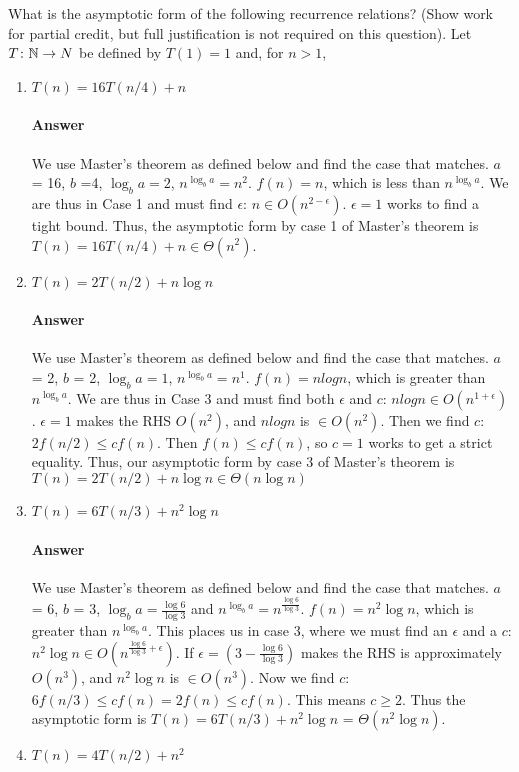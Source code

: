 \documentclass{article}
\begin{document}
\collab{\todo{}}

What is the asymptotic form of the following recurrence
relations? (Show work for partial credit, but full justification is not required
on this question).
Let $T \colon {\mathbb N} \to N$ be defined by $T(1)=1$ and, for $n>1$,
\begin{enumerate}
    \item $T(n) = 16 T(n/4) + n$
        \paragraph{Answer}{We use Master's theorem as defined below and find the case that matches. $a$ = 16, $b$ =4, ${\log_b a} = 2$, $n^{\log_b a} = n^2$. $f(n) = n$, which is less than $n^{\log_b a}$. We are thus in Case 1 and must find $\epsilon$: $n \in O(n^{2-\epsilon})$. $\epsilon = 1$ works to find a tight bound. Thus, the asymptotic form by case 1 of Master's theorem is $T(n) = 16 T(n/4) + n \in \Theta(n^2)$.}
    \item $T(n) = 2 T(n/2) + n \log{n}$
        \paragraph{Answer}{We use Master's theorem as defined below and find the case that matches. $a$ = 2, $b$ = 2, ${\log_b a} = 1$, $n^{\log_b a} = n^1$. $f(n) = nlogn$, which is greater than $n^{\log_b a}$. We are thus in Case 3 and must find both $\epsilon$ and $c$: $nlogn \in O(n^{1+\epsilon})$. $\epsilon = 1$ makes the RHS $O(n^2)$, and $nlogn$ is $\in O(n^2)$. Then we find $c$: $2f(n/2) \leq cf(n)$. Then $f(n) \leq cf(n)$, so $c = 1$ works to get a strict equality. Thus, our asymptotic form by case 3 of Master's theorem is $T(n) = 2 T(n/2) + n \log{n} \in \Theta(n \log{n})$}
    \item $T(n) = 6 T(n/3) + n^2 \log{n}$
        \paragraph{Answer}{We use Master's theorem as defined below and find the case that matches. $a$ = 6, $b$ = 3, ${\log_b a} = \frac{\log 6}{\log 3}$ and $n^{\log_b a} = n^{\frac{\log 6}{\log 3}}$. $f(n) = n^2{\log n}$, which is greater than $n^{\log_b a}$. This places us in case 3, where we must find an $\epsilon$ and a $c$: $n^2{\log n} \in O(n^{\frac{\log 6}{\log 3}+\epsilon})$. If $\epsilon = (3 - \frac{\log 6}{\log 3})$ makes the RHS is approximately $O(n^3)$, and $n^2{\log n}$ is $\in O(n^3)$. Now we find $c$: $6f(n/3) \leq cf(n) = 2f(n) \leq cf(n)$. This means $c \geq 2$. Thus the asymptotic form is  $T(n) = 6 T(n/3) + n^2 \log{n}$ = $\Theta(n^2{\log n}).$ }
    \item $T(n) = 4 T(n/2) + n^2$

\end{enumerate}
\end{document}
